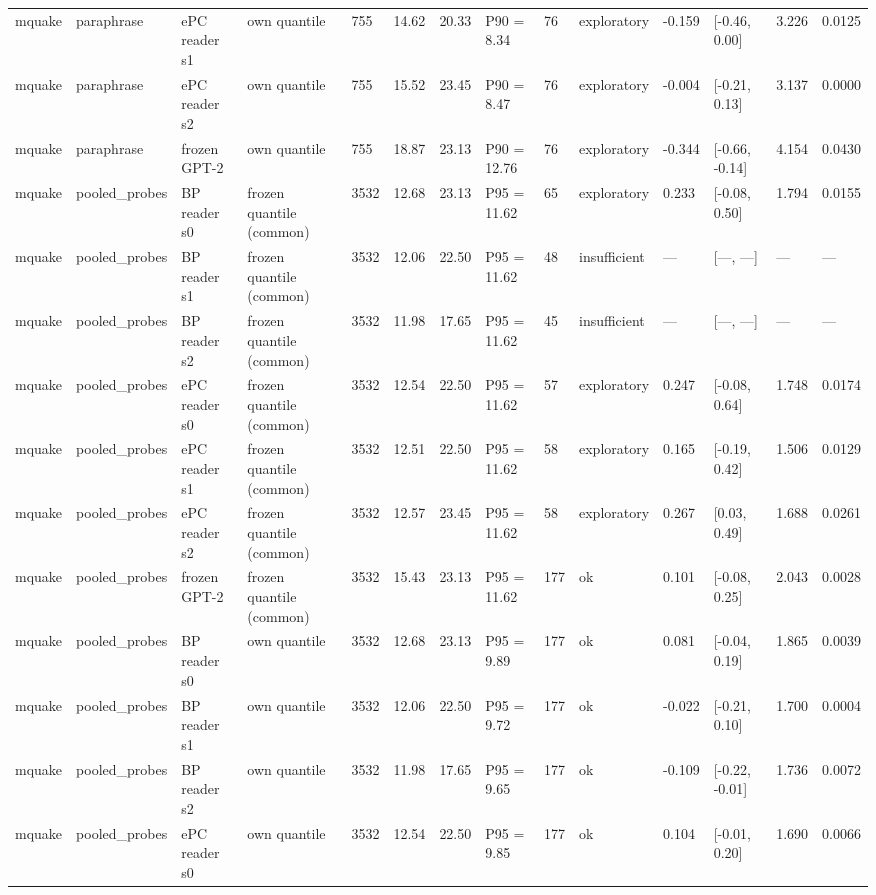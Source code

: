 \documentclass[10pt,a4paper]{article}
\begin{document}
\begin{center}
\begin{tabularx}{\textwidth}{@{}p{}XXXXXXXXXXXXX@{}}
mquake & paraphrase & ePC reader s1 & own quantile & 755 & 14.62 & 20.33 & P90 = 8.34 & 76 & exploratory & -0.159 & [-0.46, 0.00] & 3.226 & 0.0125 \\
mquake & paraphrase & ePC reader s2 & own quantile & 755 & 15.52 & 23.45 & P90 = 8.47 & 76 & exploratory & -0.004 & [-0.21, 0.13] & 3.137 & 0.0000 \\
mquake & paraphrase & frozen GPT-2 & own quantile & 755 & 18.87 & 23.13 & P90 = 12.76 & 76 & exploratory & -0.344 & [-0.66, -0.14] & 4.154 & 0.0430 \\
mquake & pooled\_probes & BP reader s0 & frozen quantile (common) & 3532 & 12.68 & 23.13 & P95 = 11.62 & 65 & exploratory & 0.233 & [-0.08, 0.50] & 1.794 & 0.0155 \\
mquake & pooled\_probes & BP reader s1 & frozen quantile (common) & 3532 & 12.06 & 22.50 & P95 = 11.62 & 48 & insufficient & — & [—, —] & — & — \\
mquake & pooled\_probes & BP reader s2 & frozen quantile (common) & 3532 & 11.98 & 17.65 & P95 = 11.62 & 45 & insufficient & — & [—, —] & — & — \\
mquake & pooled\_probes & ePC reader s0 & frozen quantile (common) & 3532 & 12.54 & 22.50 & P95 = 11.62 & 57 & exploratory & 0.247 & [-0.08, 0.64] & 1.748 & 0.0174 \\
mquake & pooled\_probes & ePC reader s1 & frozen quantile (common) & 3532 & 12.51 & 22.50 & P95 = 11.62 & 58 & exploratory & 0.165 & [-0.19, 0.42] & 1.506 & 0.0129 \\
mquake & pooled\_probes & ePC reader s2 & frozen quantile (common) & 3532 & 12.57 & 23.45 & P95 = 11.62 & 58 & exploratory & 0.267 & [0.03, 0.49] & 1.688 & 0.0261 \\
mquake & pooled\_probes & frozen GPT-2 & frozen quantile (common) & 3532 & 15.43 & 23.13 & P95 = 11.62 & 177 & ok & 0.101 & [-0.08, 0.25] & 2.043 & 0.0028 \\
mquake & pooled\_probes & BP reader s0 & own quantile & 3532 & 12.68 & 23.13 & P95 = 9.89 & 177 & ok & 0.081 & [-0.04, 0.19] & 1.865 & 0.0039 \\
mquake & pooled\_probes & BP reader s1 & own quantile & 3532 & 12.06 & 22.50 & P95 = 9.72 & 177 & ok & -0.022 & [-0.21, 0.10] & 1.700 & 0.0004 \\
mquake & pooled\_probes & BP reader s2 & own quantile & 3532 & 11.98 & 17.65 & P95 = 9.65 & 177 & ok & -0.109 & [-0.22, -0.01] & 1.736 & 0.0072 \\
mquake & pooled\_probes & ePC reader s0 & own quantile & 3532 & 12.54 & 22.50 & P95 = 9.85 & 177 & ok & 0.104 & [-0.01, 0.20] & 1.690 & 0.0066 \\

\end{tabularx}
\end{center}
\end{document}
